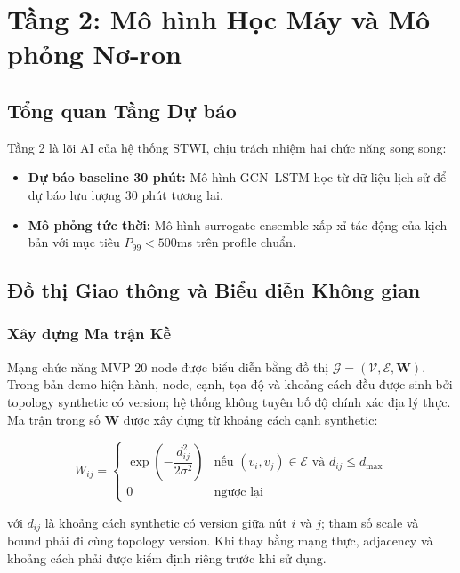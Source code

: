 \chapter{Tầng 2: Mô hình Học Máy và Mô phỏng Nơ-ron}

\section{Tổng quan Tầng Dự báo}

Tầng 2 là lõi AI của hệ thống STWI, chịu trách nhiệm hai chức năng song song:
\begin{itemize}[itemsep=3pt]
  \item \textbf{Dự báo baseline 30 phút:} Mô hình GCN–LSTM học từ dữ liệu lịch sử để dự báo lưu lượng 30 phút tương lai.
  \item \textbf{Mô phỏng tức thời:} Mô hình surrogate ensemble xấp xỉ tác động của kịch bản với mục tiêu $P_{99}<500$ms trên profile chuẩn.
\end{itemize}

\section{Đồ thị Giao thông và Biểu diễn Không gian}

\subsection{Xây dựng Ma trận Kề}

Mạng chức năng MVP 20 node được biểu diễn bằng đồ thị $\mathcal{G} = (\mathcal{V}, \mathcal{E}, \mathbf{W})$. Trong bản demo hiện hành, node, cạnh, tọa độ và khoảng cách đều được sinh bởi topology synthetic có version; hệ thống không tuyên bố độ chính xác địa lý thực. Ma trận trọng số $\mathbf{W}$ được xây dựng từ khoảng cách cạnh synthetic:

\begin{equation}
  W_{ij} = \begin{cases}
    \exp\!\left(-\dfrac{d_{ij}^2}{2\sigma^2}\right) & \text{nếu } (v_i, v_j) \in \mathcal{E} \text{ và } d_{ij} \leq d_{\max} \\
    0 & \text{ngược lại}
  \end{cases}
  \label{eq:weight_matrix}
\end{equation}

với $d_{ij}$ là khoảng cách synthetic có version giữa nút $i$ và $j$; tham số scale và bound phải đi cùng topology version. Khi thay bằng mạng thực, adjacency và khoảng cách phải được kiểm định riêng trước khi sử dụng.

